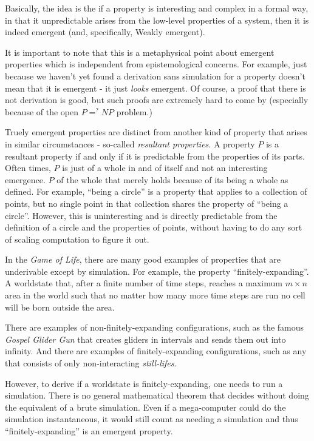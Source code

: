\documentclass{article}
\newcommand{\ti}[1]{\textit{#1}}
\begin{document}
Basically, the idea is the if a property is interesting and complex in a formal way, in that it unpredictable arises from the low-level properties of a system, then it is indeed emergent (and, specifically, Weakly emergent).

It is important to note that this is a metaphysical point about emergent properties which is independent from epistemological concerns. For example, just because we haven't yet found a derivation sans simulation for a property doesn't mean that it is emergent - it just \ti{looks} emergent. Of course, a proof that there is not derivation is good, but such proofs are extremely hard to come by (especially because of the open $P =^? NP$ problem.)

Truely emergent properties are distinct from another kind of property that arises in similar circumstances - so-called \ti{resultant properties}. A property $P$ is a resultant property if and only if it is predictable from the properties of its parts. Often times, $P$ is just of a whole in and of itself and not an interesting emergence. $P$ of the whole that merely holds because of its being a whole as defined. For example, ``being a circle'' is a property that applies to a collection of points, but no single point in that collection shares the property of ``being a circle''. However, this is uninteresting and is directly predictable from the definition of a circle and the properties of points, without having to do any sort of scaling computation to figure it out.


In the \ti{Game of Life}, there are many good examples of properties that are underivable except by simulation. For example, the property ``finitely-expanding''. A worldstate that, after a finite number of time steps, reaches a maximum $m \times n$ area in the world such that no matter how many more time steps are run no cell will be born outside the area.

There are examples of non-finitely-expanding configurations, such as the famous \ti{Gospel Glider Gun} that creates gliders in intervals and sends them out into infinity. And there are examples of finitely-expanding configurations, such as any that consists of only non-interacting \ti{still-lifes}.

However, to derive if a worldstate is finitely-expanding, one needs to run a simulation. There is no general mathematical theorem that decides without doing the equivalent of a brute simulation. Even if a mega-computer could do the simulation instantaneous, it would still count as needing a simulation and thus ``finitely-expanding'' is an emergent property.
\end{document}
